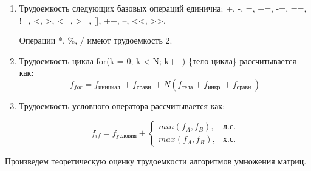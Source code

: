 \begin{enumerate}

	\item Трудоемкость следующих базовых операций единична:
	+, -, =, +=, -=, ==, !=, <, >, <=, >=, [], ++, --, <<, >>.
	
	Операции *, \%, / имеют трудоемкость 2.
	
	\item Трудоемкость цикла for(k = 0; k < N; k++) \{тело цикла\} рассчитывается как:
	\begin{equation}
		\label{for:for}
		f_{for} = f_{\text{инициал.}} + f_{\text{сравн.}} + N(f_{\text{тела}} + f_{\text{инкр.}} + f_{\text{сравн.}})
	\end{equation}
	
	\item Трудоемкость условного оператора  рассчитывается как:
	
	\begin{equation}
		\label{for:if}
		f_{if} = f_{\text{условия}} +
		\begin{cases}
			min(f_A, f_B), & \text{л.с.}\\
			max(f_A, f_B), & \text{х.с.}
		\end{cases}
	\end{equation}
	
\end{enumerate}


Произведем теоретическую оценку трудоемкости алгоритмов умножения матриц.

